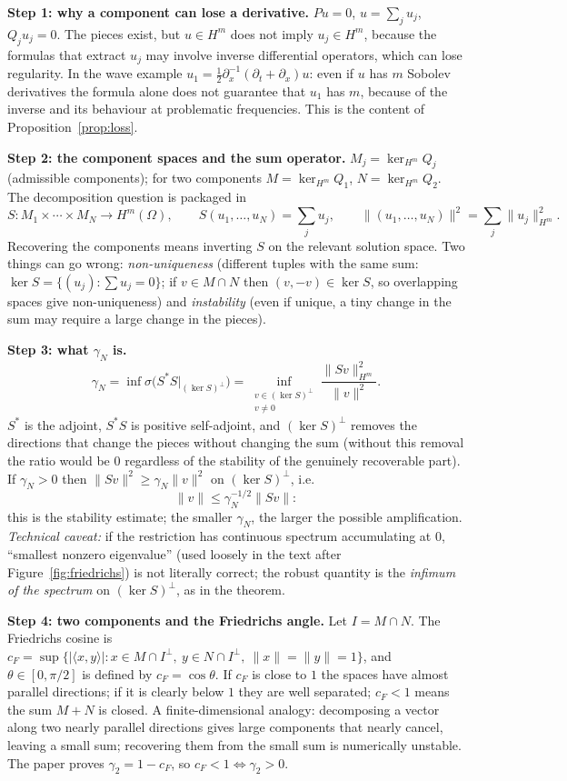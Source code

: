 \medskip\textbf{Step 1: why a component can lose a derivative.} $Pu=0$, $u=\sum_ju_j$, $Q_ju_j=0$. The pieces exist, but $u\in H^m$ does not imply $u_j\in H^m$, because the formulas that extract $u_j$ may involve inverse differential operators, which can lose regularity. In the wave example $u_1=\tfrac12\partial_x^{-1}(\partial_t+\partial_x)u$: even if $u$ has $m$ Sobolev derivatives the formula alone does not guarantee that $u_1$ has $m$, because of the inverse and its behaviour at problematic frequencies. This is the content of Proposition~\ref{prop:loss}.

\medskip\textbf{Step 2: the component spaces and the sum operator.} $M_j=\ker_{H^m}Q_j$ (admissible components); for two components $M=\ker_{H^m}Q_1$, $N=\ker_{H^m}Q_2$. The decomposition question is packaged in
\[
S:M_1\times\cdots\times M_N\to H^m(\Omega),\qquad S(u_1,\dots,u_N)=\sum_ju_j,\qquad \|(u_1,\dots,u_N)\|^2=\sum_j\|u_j\|_{H^m}^2 .
\]
Recovering the components means inverting $S$ on the relevant solution space. Two things can go wrong: \emph{non-uniqueness} (different tuples with the same sum: $\ker S=\{(u_j):\sum u_j=0\}$; if $v\in M\cap N$ then $(v,-v)\in\ker S$, so overlapping spaces give non-uniqueness) and \emph{instability} (even if unique, a tiny change in the sum may require a large change in the pieces).

\medskip\textbf{Step 3: what $\gamma_N$ is.}
\[
\gamma_N=\inf\sigma\big(S^*S|_{(\ker S)^\perp}\big)=\inf_{\substack{v\in(\ker S)^\perp\\v\ne0}}\frac{\|Sv\|_{H^m}^2}{\|v\|^2}.
\]
$S^*$ is the adjoint, $S^*S$ is positive self-adjoint, and $(\ker S)^\perp$ removes the directions that change the pieces without changing the sum (without this removal the ratio would be $0$ regardless of the stability of the genuinely recoverable part). If $\gamma_N>0$ then $\|Sv\|^2\ge\gamma_N\|v\|^2$ on $(\ker S)^\perp$, i.e.
\[
\|v\|\le\gamma_N^{-1/2}\|Sv\|:
\]
this is the stability estimate; the smaller $\gamma_N$, the larger the possible amplification. \emph{Technical caveat:} if the restriction has continuous spectrum accumulating at $0$, ``smallest nonzero eigenvalue'' (used loosely in the text after Figure~\ref{fig:friedrichs}) is not literally correct; the robust quantity is the \emph{infimum of the spectrum} on $(\ker S)^\perp$, as in the theorem.

\medskip\textbf{Step 4: two components and the Friedrichs angle.} Let $I=M\cap N$. The Friedrichs cosine is $c_F=\sup\{|\langle x,y\rangle|:x\in M\cap I^\perp,\ y\in N\cap I^\perp,\ \|x\|=\|y\|=1\}$, and $\theta\in[0,\pi/2]$ is defined by $c_F=\cos\theta$. If $c_F$ is close to $1$ the spaces have almost parallel directions; if it is clearly below $1$ they are well separated; $c_F<1$ means the sum $M+N$ is closed. A finite-dimensional analogy: decomposing a vector along two nearly parallel directions gives large components that nearly cancel, leaving a small sum; recovering them from the small sum is numerically unstable. The paper proves $\gamma_2=1-c_F$, so $c_F<1\iff\gamma_2>0$.

